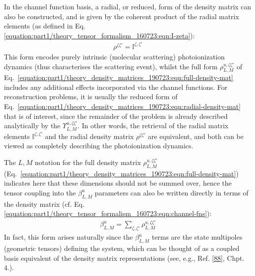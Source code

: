 \documentclass[letterpaper,table,10pt,english]{jupyterBook}
\begin{document}
\sphinxAtStartPar
In the channel function basis, a radial, or reduced, form of the density matrix can also be constructed, and is given by the coherent product of the radial matrix elements (as defined in Eq. \eqref{equation:part1/theory_tensor_formalism_160723:eqn:I-zeta}):
\begin{equation}\label{equation:part1/theory_density_matrices_190723:eqn:radial-density-mat}
\begin{split}
\rho^{\zeta\zeta'} = \mathbb{I}^{\zeta,\zeta'}
\end{split}
\end{equation}
\sphinxAtStartPar
This form encodes purely intrinsic (molecular scattering) photoionization dynamics (thus characterises the scattering event), whilst the full form \({\rho}_{L,M}^{u,\zeta\zeta'}\) of Eq. \eqref{equation:part1/theory_density_matrices_190723:eqn:full-density-mat} includes any additional effects incorporated via the channel functions. For reconstruction problems, it is usually the reduced form of Eq. \eqref{equation:part1/theory_density_matrices_190723:eqn:radial-density-mat} that is of interest, since the remainder of the problem is already described analytically by the {\hyperref[\detokenize{backmatter/glossary:term-channel-functions}]{}} \(\varUpsilon_{L,M}^{u,\zeta\zeta'}\). In other words, the retrieval of the radial matrix elements \(\mathbb{I}^{\zeta,\zeta'}\) and the radial density matrix \(\rho^{\zeta\zeta'}\) are equivalent, and both can be viewed as completely describing the photoionization dynamics.

\sphinxAtStartPar
The \(L,M\) notation for the full density matrix \({\rho}_{L,M}^{u,\zeta\zeta'}\) (Eq. \eqref{equation:part1/theory_density_matrices_190723:eqn:full-density-mat}) indicates here that these dimensions should not be summed over, hence the tensor coupling into the \(\beta_{L,M}^{u}\) parameters can also be written directly in terms of the density matrix (cf. Eq. \eqref{equation:part1/theory_tensor_formalism_160723:eqn:channel-fns}):
\begin{equation}\label{equation:part1/theory_density_matrices_190723:eqn:beta-density-mat}
\begin{split}
\beta_{L,M}^{u}=\sum_{\zeta,\zeta'}{\rho}_{L,M}^{u,\zeta\zeta'}
\end{split}
\end{equation}
\sphinxAtStartPar
In fact, this form arises naturally since the \(\beta_{L,M}^{u}\) terms are the state multipoles (geometric tensors) defining the system, which can be thought of as a coupled basis equivalent of the density matrix representations (see, e.g., Ref. {[}\hyperlink{cite.backmatter/bibliography:id525}{88}{]}, Chpt. 4.).
\end{document}
